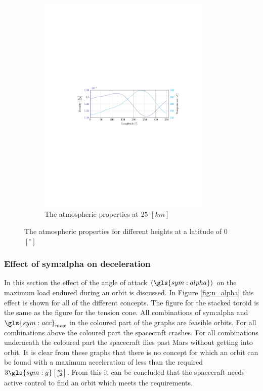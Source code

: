 \begin{figure}[ht!]
\begin{subfigure}{0.9\textwidth}
	\includegraphics[trim={4.5cm 11cm 3.1cm 11cm},clip,width=0.9\textwidth]{Figure/atmos_model/lon_25.pdf}
	\caption{The atmospheric properties at $25$ $\left[km\right]$} 
	\label{fig:atmos_lon_25}
	\end{subfigure}
	\caption{The atmospheric properties for different heights at a latitude of 0 $\left[^\circ\right]$}
	\label{fig:atmos_lon}
\end{figure}

\subsubsection{Effect of \gls{sym:alpha} on deceleration}
\label{sec:astrodec}

In this section the effect of the angle of attack $\left(\gls{sym:alpha}\right)$ on the maximum load endured during an orbit is discussed. In Figure \ref{fig:n_alpha} this effect is shown for all of the different concepts. The figure for the stacked toroid is the same as the figure for the tension cone. All combinations of \gls{sym:alpha} and $\gls{sym:acc}_{max}$ in the coloured part of the graphs are feasible orbits. For all combinations above the coloured part the spacecraft crashes. For all combinations underneath the coloured part the spacecraft flies past Mars without getting into orbit. It is clear from these graphs that there is no concept for which an orbit can be found with a maximum acceleration of less than the required $3 \gls{sym:g} \left[\frac{m}{s^2}\right]$. From this it can be concluded that the spacecraft needs active control to find an orbit which meets the requirements.

